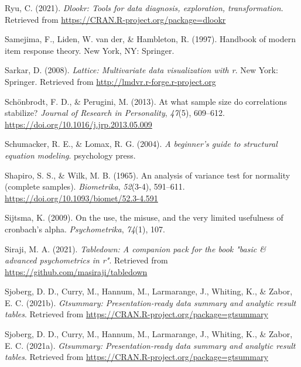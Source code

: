 \documentclass[
  english,
  man]{apa6}
\newlength{\cslhangindent}
\newlength{\cslentryspacingunit} %
\newenvironment{CSLReferences}[2] %
 {%
  \setlength{\parindent}{0pt}
  \ifodd #1
  \let\oldpar\par
  \def\par{\hangindent=\cslhangindent\oldpar}
  \fi
  \setlength{\parskip}{#2\cslentryspacingunit}
 }%
 {}
\begin{document}
\begin{CSLReferences}{1}{0}
\leavevmode{}%
Ryu, C. (2021). \emph{Dlookr: Tools for data diagnosis, exploration, transformation}. Retrieved from \url{https://CRAN.R-project.org/package=dlookr}

\leavevmode{}%
Samejima, F., Liden, W. van der, \& Hambleton, R. (1997). Handbook of modern item response theory. New York, NY: Springer.

\leavevmode{}%
Sarkar, D. (2008). \emph{Lattice: Multivariate data visualization with r}. New York: Springer. Retrieved from \url{http://lmdvr.r-forge.r-project.org}

\leavevmode{}%
Schönbrodt, F. D., \& Perugini, M. (2013). At what sample size do correlations stabilize? \emph{Journal of Research in Personality}, \emph{47}(5), 609--612. \url{https://doi.org/10.1016/j.jrp.2013.05.009}

\leavevmode{}%
Schumacker, R. E., \& Lomax, R. G. (2004). \emph{A beginner's guide to structural equation modeling}. psychology press.

\leavevmode{}%
Shapiro, S. S., \& Wilk, M. B. (1965). An analysis of variance test for normality (complete samples). \emph{Biometrika}, \emph{52}(3-4), 591--611. \url{https://doi.org/10.1093/biomet/52.3-4.591}

\leavevmode{}%
Sijtsma, K. (2009). On the use, the misuse, and the very limited usefulness of cronbach's alpha. \emph{Psychometrika}, \emph{74}(1), 107.

\leavevmode{}%
Siraji, M. A. (2021). \emph{Tabledown: A companion pack for the book "basic \& advanced psychometrics in r"}. Retrieved from \url{https://github.com/masiraji/tabledown}

\leavevmode{}%
Sjoberg, D. D., Curry, M., Hannum, M., Larmarange, J., Whiting, K., \& Zabor, E. C. (2021b). \emph{Gtsummary: Presentation-ready data summary and analytic result tables}. Retrieved from \url{https://CRAN.R-project.org/package=gtsummary}

\leavevmode{}%
Sjoberg, D. D., Curry, M., Hannum, M., Larmarange, J., Whiting, K., \& Zabor, E. C. (2021a). \emph{Gtsummary: Presentation-ready data summary and analytic result tables}. Retrieved from \url{https://CRAN.R-project.org/package=gtsummary}


\end{CSLReferences}
\end{document}
